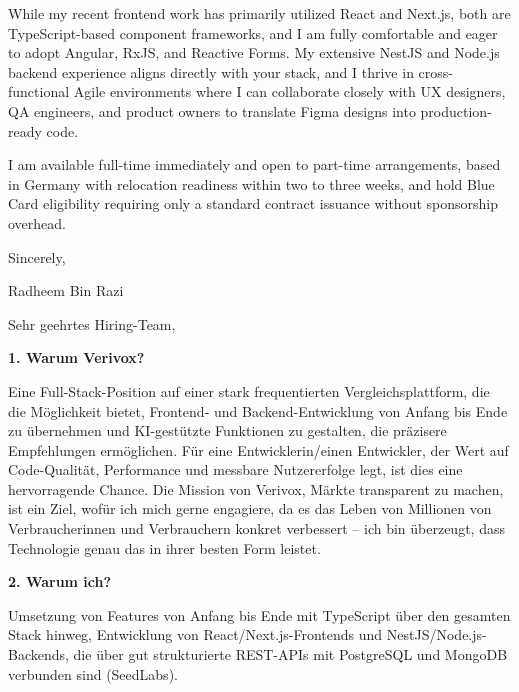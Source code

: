 \documentclass[11pt,a4paper]{coverletter}
\begin{document}
\bulletsend

While my recent frontend work has primarily utilized React and Next.js, both are TypeScript-based component frameworks, and I am fully comfortable and eager to adopt Angular, RxJS, and Reactive Forms. My extensive NestJS and Node.js backend experience aligns directly with your stack, and I thrive in cross-functional Agile environments where I can collaborate closely with UX designers, QA engineers, and product owners to translate Figma designs into production-ready code.

I am available full-time immediately and open to part-time arrangements, based in Germany with relocation readiness within two to three weeks, and hold Blue Card eligibility requiring only a standard contract issuance without sponsorship overhead.

\closing{Sincerely,}{Radheem Bin Razi}

\clearpage
{}


\opening{Sehr geehrtes Hiring-Team,}

\vspace{8pt}\noindent\textbf{1. Warum Verivox?}\par\vspace{3pt}

Eine Full-Stack-Position auf einer stark frequentierten Vergleichsplattform, die die Möglichkeit bietet, Frontend- und Backend-Entwicklung von Anfang bis Ende zu übernehmen und KI-gestützte Funktionen zu gestalten, die präzisere Empfehlungen ermöglichen. Für eine Entwicklerin/einen Entwickler, der Wert auf Code-Qualität, Performance und messbare Nutzererfolge legt, ist dies eine hervorragende Chance. Die Mission von Verivox, Märkte transparent zu machen, ist ein Ziel, wofür ich mich gerne engagiere, da es das Leben von Millionen von Verbraucherinnen und Verbrauchern konkret verbessert – ich bin überzeugt, dass Technologie genau das in ihrer besten Form leistet.

\vspace{8pt}\noindent\textbf{2. Warum ich?}\par\vspace{3pt}

\bullets

  \item Umsetzung von Features von Anfang bis Ende mit TypeScript über den gesamten Stack hinweg, Entwicklung von React/Next.js-Frontends und NestJS/Node.js-Backends, die über gut strukturierte REST-APIs mit PostgreSQL und MongoDB verbunden sind (SeedLabs).
\end{document}
